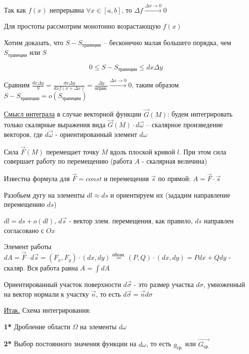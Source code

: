 \documentclass[12pt]{article}
\begin{document}
    Так как $f(x)$ непрерывна $\forall x \in [a, b]$, то $\Delta f \stackrel{\Delta x \to 0}{\rightarrow} 0$

    Для простоты рассмотрим монотонно возрастающую $f(x)$

    Хотим доказать, что $S - S_{\text{трапеции}}$ -- бесконечно малая большего порядка, чем $S_{\text{трапеции}}$ или $S$

    \[0 \leq S - S_{\text{трапеции}} \leq dx \Delta y\]

    Сравним $\frac{dx \Delta y}{S} = \frac{dx \Delta y}{dx f(x + \Delta x)} = \frac{\Delta y}{\text{огран.}} \stackrel{\Delta x \to 0}{\rightarrow} 0$, 
    таким образом $S - S_{\text{трапеции}} = o(S_{\text{трапеции}})$

    \underline{Смысл интеграла} в случае векторной функции $\overrightarrow{G}(M)$: будем интегрировать только скалярные выражения вида $\vec{G}(M) \cdot d\vec{\omega}$ -- скалярное произведение векторов,
    где $d\vec{\omega}$ - ориентированный элемент $d\omega$


    \Ex Сила $\overrightarrow{F}(M)$ перемещает точку $M$ вдоль плоской кривой $l$. При этом сила совершает работу по перемещению
    (работа $A$ - скалярная величина)

    Известна формула для $\overrightarrow{F} = const$ и перемещения $\overrightarrow{s}$ по прямой: $A = \overrightarrow{F} \cdot \overrightarrow{s}$

    Разобьем дугу на элементы $dl \approx ds$ и ориентируем их (зададим направление перемещению $ds$)

    $dl = ds + o(dl)$, $d\overrightarrow{s}$ - вектор элем. перемещения, как правило, $ds$ направлен согласовано с $Ox$

    Элемент работы $dA = \overrightarrow{F} \cdot d\overrightarrow{s} = (F_x, F_y) \cdot (dx, dy) \stackrel{\text{обозн.}}{=}
    (P, Q) \cdot (dx, dy) = Pdx + Qdy$ - скаляр. Вся работа равна $A = \int dA$

    \Nota Ориентированный участок поверхности $d\overrightarrow{\sigma}$ - это размер участка $d\sigma$, умноженный на вектор нормали к участку $\overrightarrow{n}$,
    то есть $d\overrightarrow{\sigma} = \overrightarrow{n}d\sigma$

    \underline{Итак.} Схема интегрирования:

    \textbf{1*} Дробление области $\Omega$ на элементы $d\omega$

    \textbf{2*} Выбор постоянного значения функции на $d\omega$, то есть $g_{\text{ср.}}$ или $\overrightarrow{G_\text{ср.}}$
\end{document}
